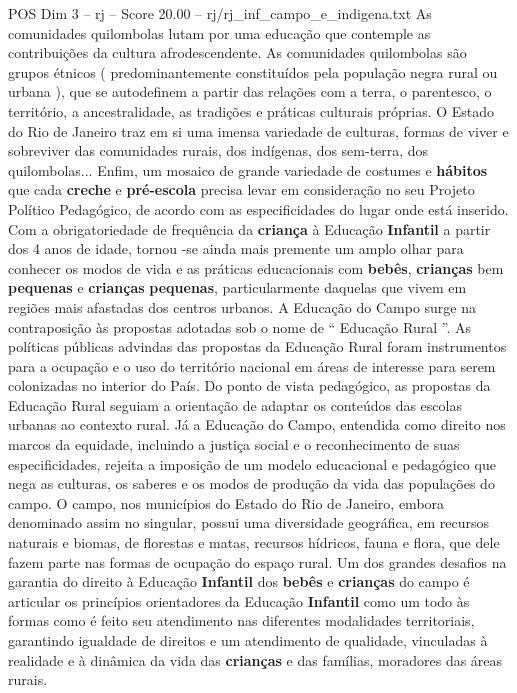 \begin{textsample}{POS Dim 3 – rj – Score 20.00 – rj/rj\_inf\_campo\_e\_indigena.txt}
As comunidades quilombolas lutam por uma educação que contemple as contribuições da cultura afrodescendente.
As comunidades quilombolas são grupos étnicos ( predominantemente constituídos pela população negra rural ou urbana ), que se autodefinem a partir das relações com a terra, o parentesco, o território, a ancestralidade, as tradições e práticas culturais próprias.
O Estado do Rio de Janeiro traz em si uma imensa variedade de culturas, formas de viver e sobreviver das comunidades rurais, dos indígenas, dos sem-terra, dos quilombolas...
Enfim, um mosaico de grande variedade de costumes e \textbf{hábitos} que cada \textbf{creche} e \textbf{pré-escola} precisa levar em consideração no seu Projeto Político Pedagógico, de acordo com as especificidades do lugar onde está inserido.
Com a obrigatoriedade de frequência da \textbf{criança} à Educação \textbf{Infantil} a partir dos 4 anos de idade, tornou -se ainda mais premente um amplo olhar para conhecer os modos de vida e as práticas educacionais com \textbf{bebês}, \textbf{crianças} bem \textbf{pequenas} e \textbf{crianças} \textbf{pequenas}, particularmente daquelas que vivem em regiões mais afastadas dos centros urbanos.
A Educação do Campo surge na contraposição às propostas adotadas sob o nome de “ Educação Rural ”.
As políticas públicas advindas das propostas da Educação Rural foram instrumentos para a ocupação e o uso do território nacional em áreas de interesse para serem colonizadas no interior do País.
Do ponto de vista pedagógico, as propostas da Educação Rural seguiam a orientação de adaptar os conteúdos das escolas urbanas ao contexto rural.
Já a Educação do Campo, entendida como direito nos marcos da equidade, incluindo a justiça social e o reconhecimento de suas especificidades, rejeita a imposição de um modelo educacional e pedagógico que nega as culturas, os saberes e os modos de produção da vida das populações do campo.
O campo, nos municípios do Estado do Rio de Janeiro, embora denominado assim no singular, possui uma diversidade geográfica, em recursos naturais e biomas, de florestas e matas, recursos hídricos, fauna e flora, que dele fazem parte nas formas de ocupação do espaço rural.
Um dos grandes desafios na garantia do direito à Educação \textbf{Infantil} dos \textbf{bebês} e \textbf{crianças} do campo é articular os princípios orientadores da Educação \textbf{Infantil} como um todo às formas como é feito seu atendimento nas diferentes modalidades territoriais, garantindo igualdade de direitos e um atendimento de qualidade, vinculadas à realidade e à dinâmica da vida das \textbf{crianças} e das famílias, moradores das áreas rurais.

\end{textsample}
